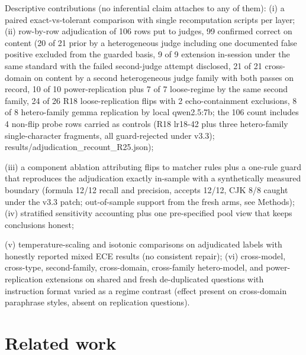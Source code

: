\documentclass[10pt]{article} %
\begin{document}
Descriptive contributions (no inferential claim attaches to any of them): (i) a paired exact-vs-tolerant comparison with single recomputation scripts per layer; (ii) row-by-row adjudication of 106 rows put to judges, 99 confirmed correct on content (20 of 21 prior by a heterogeneous judge including one documented false positive excluded from the guarded basis, 9 of 9 extension in-session under the same standard with the failed second-judge attempt disclosed, 21 of 21 cross-domain on content by a second heterogeneous judge family with both passes on record, 10 of 10 power-replication plus 7 of 7 loose-regime by the same second family, 24 of 26 R18 loose-replication flips with 2 echo-containment exclusions, 8 of 8 hetero-family gemma replication by local qwen2.5:7b; the 106 count includes 4 non-flip probe rows carried as controls (R18 lr18-42 plus three hetero-family single-character fragments, all guard-rejected under v3.3); results/adjudication\_recount\_R25.json);

(iii) a component ablation attributing flips to matcher rules plus a one-rule guard that reproduces the adjudication exactly in-sample with a synthetically measured boundary (formula 12/12 recall and precision, accepts 12/12, CJK 8/8 caught under the v3.3 patch; out-of-sample support from the fresh arms, see Methods); (iv) stratified sensitivity accounting plus one pre-specified pool view that keeps conclusions honest;

(v) temperature-scaling and isotonic comparisons on adjudicated labels with honestly reported mixed ECE results (no consistent repair); (vi) cross-model, cross-type, second-family, cross-domain, cross-family hetero-model, and power-replication extensions on shared and fresh de-duplicated questions with instruction format varied as a regime contrast (effect present on cross-domain paraphrase styles, absent on replication questions).

\section{Related work}
\label{sec:related}
\end{document}
